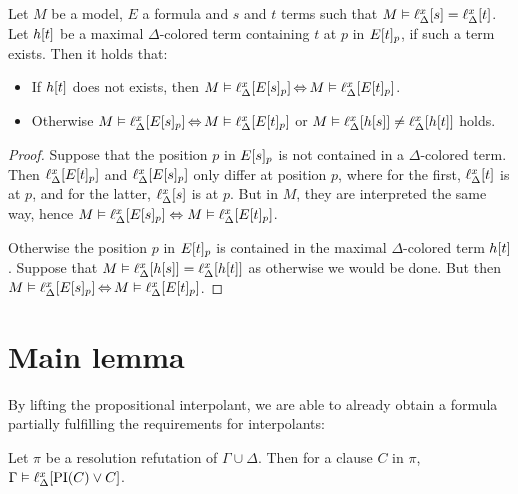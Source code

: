 \begin{lemma}
	\label{aga5tg5ba}
	Let $M$ be a model, $E$ a formula and $s$ and $t$ terms such that
	$M \vDash \ell_{\Delta}^{x}[s] = \ell_{\Delta}^{x}[t]$.
	Let $h[t]$ be a maximal $\Delta$-colored term containing $t$ at $p$ in $E{[t]_{p}}$, if such a term exists. Then it holds that:
	\begin{itemize}
		\item If $h[t]$ does not exists, then
			$M\vDash \ell_{\Delta}^{x}[E{[s]_{p}}] \operatorname{\Leftrightarrow} M \vDash \ell_{\Delta}^{x}[E{[t]_{p}}]$.
		\item Otherwise
			$M\vDash \ell_{\Delta}^{x}[E{[s]_{p}}] \operatorname{\Leftrightarrow} M \vDash \ell_{\Delta}^{x}[E{[t]_{p}}]$
			or $M\vDash \ell_{\Delta}^{x}[h[s]] \neq \ell_{\Delta}^{x}[h[t]]$ holds.
	\end{itemize}
\end{lemma}
\begin{proof} 
	Suppose that the position $p$ in $E{[s]_{p}}$ is not contained in a $\Delta$-colored term.
	Then $\ell_{\Delta}^{x}[E{[t]_{p}}]$ and $\ell_{\Delta}^{x}[E{[s]_{p}}]$ only differ at position $p$,
	where for the first, $\ell_{\Delta}^{x}[t]$ is at $p$, and for the latter, $\ell_{\Delta}^{x}[s]$ is at $p$.
	But in $M$, they are interpreted the same way, hence $M\entails\nolinebreak \lifdelta{E\occurat{s}{p}} \spas\semiff M \entails \lifdelta{E\occurat{t}{p}}$.

	Otherwise the position $p$ in $E{[t]_{p}}$ is contained in the maximal $\Delta$-colored term $h[t]$.
	Suppose that $M\vDash \ell_{\Delta}^{x}[h[s]]  = \ell_{\Delta}^{x}[h[t]]$ as otherwise we would be done.
	But then $M \entails\nolinebreak \lifdelta{E\occurat{s}{p}} \semiff{} M\entails \lifdelta{E\occurat{t}{p}}$.
\end{proof} 


\section{Main lemma}
\label{sec:two_phase_main_lemma}

By lifting the propositional interpolant, we are able to already obtain a formula partially fulfilling the requirements for interpolants:



\begin{lemma}
	\label{lemma:gamma_entails_lifted_interpolant}
	Let $\pi$ be a resolution refutation of $\Gamma \cup \Delta$.
	Then for a clause $C$ in $\pi$,
	$ \Gamma \entails \lifdelta{\PI(C) \lor\nolinebreak C} $.
\end{lemma}

